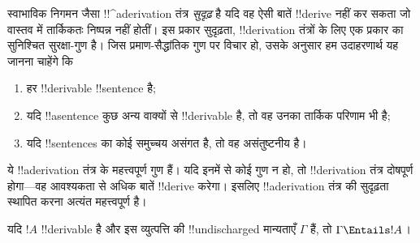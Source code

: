 \documentclass[../../../include/open-logic-section]{subfiles}
\begin{document}
      {}
      {}
      

\begin{explain}
स्वाभाविक निगमन जैसा !!^a{derivation} तंत्र \emph{सुदृढ़} है यदि वह ऐसी बातें
!!{derive} नहीं कर सकता जो वास्तव में तार्किकतः निष्पन्न नहीं होतीं। इस प्रकार
सुदृढ़ता, !!{derivation} तंत्रों के लिए एक प्रकार का सुनिश्चित सुरक्षा-गुण है।
जिस प्रमाण-सैद्धांतिक गुण पर विचार हो, उसके अनुसार हम उदाहरणार्थ यह जानना
चाहेंगे कि
\begin{enumerate}
\item हर !!{derivable} !!{sentence}  है;
\item यदि !!a{sentence} कुछ अन्य वाक्यों से !!{derivable} है, तो वह उनका
  तार्किक परिणाम भी है;
\item यदि !!{sentence}s का कोई समुच्चय असंगत है, तो वह असंतुष्टनीय है।
\end{enumerate}
ये !!a{derivation} तंत्र के महत्त्वपूर्ण गुण हैं। यदि इनमें से कोई गुण न हो,
तो !!{derivation} तंत्र दोषपूर्ण होगा---वह आवश्यकता से अधिक बातें !!{derive}
करेगा। इसलिए !!a{derivation} तंत्र की सुदृढ़ता स्थापित करना अत्यंत
महत्त्वपूर्ण है।
\end{explain}

\begin{thm}[सुदृढ़ता]
यदि $!A$ !!{derivable} है और इस व्युत्पत्ति की !!{undischarged} मान्यताएँ
$\Gamma$ हैं, तो $\Gamma \Entails !A$।
\end{thm}
\end{document}
